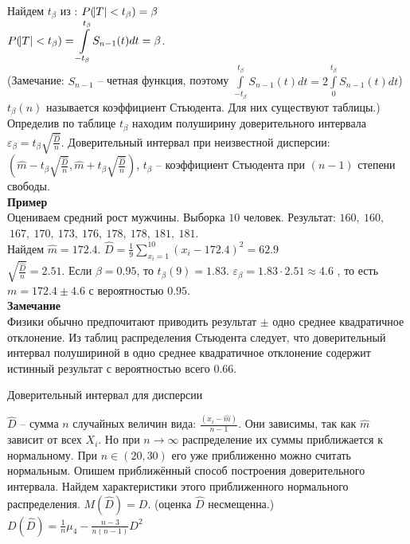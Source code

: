 \documentclass[russian, 12pt, fleqn,x11names]{article}
\begin{document}
Найдем  $t_\beta$ из : $P(\abs{T} < t_\beta) = \beta$\\
$P(\abs{T} < t_\beta) = \displaystyle{\int \limits_{-t_{\beta}}^{t_{\beta}}} S_{n-1}(t) dt = \beta$.\\
(Замечание: $S_{n-1}$ -- четная функция, поэтому  $\displaystyle{\int \limits_{-t_{\beta}}^{t_{\beta}}} S_{n-1}(t) dt =  2\displaystyle{\int \limits_{0}^{t_{\beta}}} S_{n-1}(t) dt$)\\
$t_\beta(n)$ называется коэффициент Стьюдента. Для них существуют таблицы.)\\
Определив по таблице $t_\beta$ находим полуширину доверительного интервала $\varepsilon_\beta = t_\beta \sqrt{\frac{\hat{D}}{n}}$. Доверительный интервал при неизвестной дисперсии: $(\hat{m} - t_\beta \sqrt{\frac{\hat{D}}{n}}, \hat{m} + t_\beta \sqrt{\frac{\hat{D}}{n}} )$, $t_\beta$  -- коэффициент Стьюдента при $(n-1)$ степени свободы.\\
\textbf{Пример}\\
Оцениваем средний рост мужчины. Выборка $10$ человек. Результат: $160,\ 160,$\\
 $\ 167,\ 170,\ 173,\ 176,\ 178,\ 178,\ 181,\ 181$.\\
Найдем $\hat{m} = 172.4$. $\hat{D} = \frac{1}{9} \displaystyle{\sum \limits _{x_i = 1}^{10}} (x_i - 172.4)^2 = 62.9$\\
$\sqrt{\frac{\hat{D}}{n}} = 2.51$. Если $\beta = 0.95$, то $t_\beta(9) = 1.83$. $\varepsilon_\beta = 1.83 \cdot 2.51 \approx 4.6$ , то есть $m=172.4 \pm 4.6$ с вероятностью $0.95$.\\
\textbf{Замечание\ } \\
Физики обычно предпочитают приводить результат $\pm$ одно среднее квадратичное отклонение. Из таблиц распределения Стьюдента следует, что доверительный интервал полушириной в одно среднее  квадратичное отклонение содержит истинный результат с вероятностью всего $0.66$.
\begin{center}
$\textbf{Доверительный интервал для дисперсии }$
\end{center}
$\hat{D}$ -- сумма $n$ случайных величин вида: $\frac{(x_i - \hat{m})}{n - 1}$. Они зависимы, так как $\hat{m}$ зависит от всех $X_i$. Но при  $n \rightarrow \infty$ распределение их суммы приближается к нормальному. При $n \in (20, 30)$ его уже приближенно можно считать нормальным. Опишем 
приближённый способ построения доверительного интервала. Найдем характеристики этого приближенного нормального распределения. $M(\hat{D}) = D$. (оценка $\hat{D}$ несмещенна.)\\ $D(\hat{D}) = \frac{1}{n}\mu_4 - \frac{n-3}{n(n-1)}D^2$\\
\end{document}
